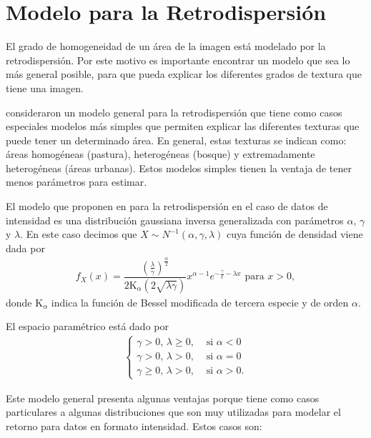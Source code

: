 \section{Modelo para la Retrodispersión}
\label{ModeloBackscatter}

El grado de homogeneidad de un área de la imagen está modelado por la retrodispersión. Por este motivo es importante encontrar un modelo que sea lo más general posible, para que pueda explicar los diferentes grados de textura que tiene una imagen.

\citet{Frery97} consideraron un modelo general para la retrodispersión que tiene como casos especiales modelos más simples que permiten explicar las diferentes texturas que puede tener un determinado área. En general, estas texturas se indican como: áreas homogéneas (pastura), heterogéneas (bosque) y extremadamente heterogéneas (áreas urbanas). Estos modelos simples tienen la ventaja de tener menos parámetros para estimar.

El modelo que proponen en \citet{Frery99} para la retrodispersión en el caso de datos de intensidad es una distribución gaussiana inversa generalizada con parámetros $\alpha$, $\gamma$ y $\lambda$. En este caso decimos que  $X\sim N^{-1}(\alpha,\gamma,\lambda)$ cuya función de densidad viene dada por
\begin{align}
f_X(x) = \dfrac{\left(\frac{\lambda}{\gamma}\right)^{\frac{\alpha}{2}}}{2 \text{K}_{\alpha} (2 \sqrt{\lambda \gamma})} x^{\alpha-1} e^{-\frac{\gamma}{x}-\lambda x} \text{ para } x>0,
\label{GIG}
\end{align}
donde $\text{K}_{\alpha}$ indica la función de Bessel modificada de tercera especie y de orden $\alpha$. 

El espacio paramétrico está dado por
\begin{align}
\begin{cases}
\label{EspacioParametros}
	\gamma>0,      \,  \lambda \geq 0,  & \text{ si } \alpha < 0\\
	\gamma>0,      \,  \lambda >0,      & \text{ si } \alpha=0\\
	\gamma \geq 0, \,  \lambda >0,      & \text{ si } \alpha>0.
\end{cases}
\end{align}

Este modelo general presenta algunas ventajas porque tiene como casos particulares a algunas distribuciones que son muy utilizadas para modelar el retorno para datos en formato intensidad. Estos casos son:

